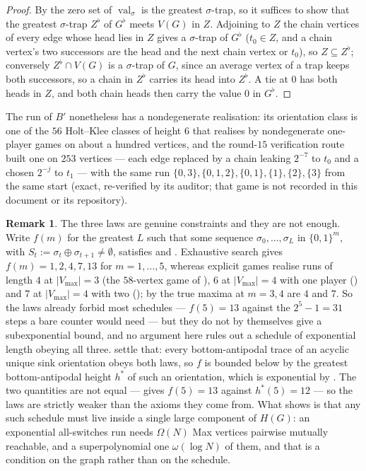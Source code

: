 \documentclass[11pt]{article}
\theoremstyle{plain}
\theoremstyle{definition}
\newtheorem{remark}[theorem]{Remark}
\DeclareMathOperator{\val}{val}
\newcommand{\Vmax}{V_{\max}}
\begin{document}
\begin{proof}
By  the zero set of $\val_\sigma$ is the greatest
$\sigma$-trap, so it suffices to show that the greatest $\sigma$-trap
$Z^{\flat}$ of $G^{\flat}$ meets $V(G)$ in $Z$. Adjoining to $Z$ the chain
vertices of every edge whose head lies in $Z$ gives a $\sigma$-trap of
$G^{\flat}$ ($t_0\in Z$, and a chain vertex's two successors are the head
and the next chain vertex or $t_0$), so $Z\subseteq Z^{\flat}$; conversely
$Z^{\flat}\cap V(G)$ is a $\sigma$-trap of $G$, since an average vertex of
a trap keeps both successors, so a chain in $Z^{\flat}$ carries its head
into $Z^{\flat}$. A tie at $0$ has both heads in $Z$, and both chain heads
then carry the value $0$ in $G^{\flat}$.
\end{proof}

The run of $B'$ nonetheless has a nondegenerate realisation: its
orientation class is one of the $56$ Holt--Klee classes of height $6$
that  realises by nondegenerate one-player games on
about a hundred vertices, and the round-$15$ verification route built one
on $253$ vertices --- each edge replaced by a chain leaking $2^{-7}$ to
$t_0$ and a chosen $2^{-j}$ to $t_1$ --- with the same run
$\{0,3\},\{0,1,2\},\{0,1\},\{1\},\{2\},\{3\}$ from the same start (exact,
re-verified by its auditor; that game is not recorded in this document or
its repository).


\begin{remark}\label{rem:allsw-laws}
The three laws are genuine constraints and they are not enough. Write
$f(m)$ for the greatest $L$ such that some sequence
$\sigma_0,\dots,\sigma_L$ in $\{0,1\}^{m}$, with $S_t:=\sigma_t\oplus
\sigma_{t+1}\ne\emptyset$, satisfies  and
. Exhaustive search gives $f(m)=1,2,4,7,13$ for
$m=1,\dots,5$, whereas explicit games realise runs of length $4$ at $|\Vmax|=3$ (the
$58$-vertex game of ), $6$ at $|\Vmax|=4$ with
one player () and $7$ at $|\Vmax|=4$ with two
(); by  the true maxima at
$m=3,4$ are $4$ and $7$. So the laws already forbid most schedules --- $f(5)=13$ against
the $2^{5}-1=31$ steps a bare counter would need --- but they do not by
themselves give a subexponential bound, and no argument here rules out a
schedule of exponential length obeying all three. 
settle that: every bottom-antipodal trace of an acyclic unique sink orientation obeys
both laws, so $f$ is bounded below by the greatest bottom-antipodal height
$h^{\ast}$ of such an orientation, which is exponential by . The two
quantities are not equal ---  gives $f(5)=13$ against
$h^{\ast}(5)=12$ --- so the laws are strictly weaker than the axioms they come
from. What
 shows is that any such schedule must live
inside a single large component of $H(G)$: an exponential all-switches
run needs $\Omega(N)$ Max vertices pairwise mutually reachable, and a
superpolynomial one $\omega(\log N)$ of them, and
that is a condition on the graph rather than on the schedule.
\end{remark}
\end{document}

